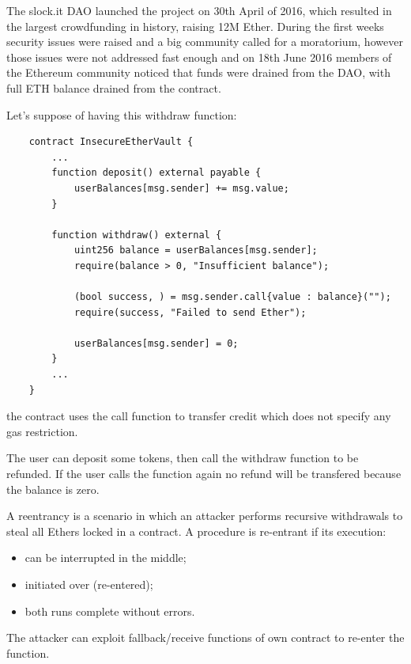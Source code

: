 The slock.it DAO launched the project on 30th April of 2016, which resulted in the largest crowdfunding in history, raising 12M Ether.
During the first weeks security issues were raised and a big community called for a moratorium, however those issues were not addressed fast enough and on 18th June 2016 members of the Ethereum community noticed that funds were drained from the DAO, with full ETH balance drained from the contract.

Let's suppose of having this withdraw function:
\begin{verbatim}
    contract InsecureEtherVault {
        ...
        function deposit() external payable {
            userBalances[msg.sender] += msg.value;
        }
    
        function withdraw() external {
            uint256 balance = userBalances[msg.sender];
            require(balance > 0, "Insufficient balance");
    
            (bool success, ) = msg.sender.call{value : balance}("");
            require(success, "Failed to send Ether");
    
            userBalances[msg.sender] = 0;
        }
        ...
    }
\end{verbatim}
the contract uses the call function to transfer credit which does not specify any gas restriction.

The user can deposit some tokens, then call the withdraw function to be refunded.
If the user calls the function again no refund will be transfered because the balance is zero.

A reentrancy is a scenario in which an attacker performs recursive withdrawals to steal all Ethers locked in a contract.
A procedure is re-entrant if its execution:
\begin{itemize}
    \item can be interrupted in the middle;
    \item initiated over (re-entered);
    \item both runs complete without errors.
\end{itemize}
The attacker can exploit fallback/receive functions of own contract to re-enter the function.

